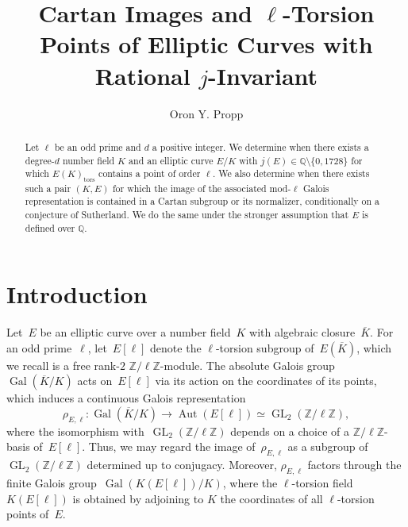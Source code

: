 \documentclass[table,dvipsnames]{amsart}
\title[Cartan Images and $\ell$-Torsion Points of Elliptic Curves]{Cartan Images and $\ell$-Torsion Points of Elliptic Curves with Rational $j$-Invariant}
\author{Oron Y. Propp}
\newcommand{\Q}{\mathbb{Q}}
\newcommand{\Aut}{\operatorname{Aut}}
\newcommand{\Gal}{\operatorname{Gal}}
\newcommand{\GL}{\operatorname{GL}}
\newcommand{\Z}{\mathbb{Z}}
\newcommand{\Kbar}{\overline K}
\newcommand{\tor}{\mathrm{tors}}
\numberwithin{equation}{section}
\begin{document}
\begin{abstract}
Let $\ell$ be an odd prime and $d$ a positive integer. We determine when there exists a degree-$d$ number field $K$ and an elliptic curve $E/K$ with $j(E)\in\Q\setminus\{0,1728\}$ for which $E(K)_\tor$ contains a point of order $\ell$. We also determine when there exists such a pair $(K,E)$ for which the image of the associated mod-$\ell$ Galois representation is contained in a Cartan subgroup or its normalizer, conditionally on a conjecture of Sutherland. We do the same under the stronger assumption that $E$ is defined over $\Q$.
\end{abstract}

\maketitle

\section{Introduction}

Let~$E$ be an elliptic curve over a number field~$K$ with algebraic closure~$\Kbar$. For an odd prime~$\ell$, let~$E[\ell]$ denote the $\ell$-torsion subgroup of~$E(\Kbar)$, which we recall is a free rank-$2$ $\Z/\ell\Z$-module. The absolute Galois group~$\Gal(\Kbar/K)$ acts on~$E[\ell]$ via its action on the coordinates of its points, which induces a continuous Galois representation
\begin{equation*}
\rho_{E,\ell}\colon\Gal(\Kbar/K)\to\Aut(E[\ell])\simeq\GL_2(\Z/\ell\Z),
\end{equation*}
where the isomorphism with~$\GL_2(\Z/\ell\Z)$ depends on a choice of a $\Z/\ell\Z$-basis of~$E[\ell]$. Thus, we may regard the image of~$\rho_{E,\ell}$ as a subgroup of $\GL_2(\Z/\ell\Z)$ determined up to conjugacy. Moreover, $\rho_{E,\ell}$ factors through the finite Galois group~$\Gal(K(E[\ell])/K)$, where the $\ell$-torsion field~$K(E[\ell])$ is obtained by adjoining to $K$ the coordinates of all $\ell$-torsion points of~$E$.

\end{document}
